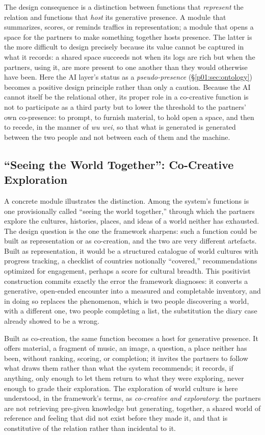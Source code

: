 The design consequence is a distinction between functions that \emph{represent} the relation and functions that \emph{host} its generative presence. A module that summarizes, scores, or reminds traffics in representation; a module that opens a space for the partners to make something together hosts presence. The latter is the more difficult to design precisely because its value cannot be captured in what it records: a shared space succeeds not when its logs are rich but when the partners, using it, are more present to one another than they would otherwise have been. Here the AI layer's status as a \emph{pseudo-presence} (§\ref{p01:sec:ontology}) becomes a positive design principle rather than only a caution. Because the AI cannot itself be the relational other, its proper role in a co-creative function is not to participate as a third party but to lower the threshold to the partners' own co-presence: to prompt, to furnish material, to hold open a space, and then to recede, in the manner of \emph{wu wei}, so that what is generated is generated between the two people and not between each of them and the machine.

\subsection{``Seeing the World Together'': Co-Creative Exploration}\label{p01:sec:seeingworld}

A concrete module illustrates the distinction. Among the system's functions is one provisionally called ``seeing the world together,'' through which the partners explore the cultures, histories, places, and ideas of a world neither has exhausted. The design question is the one the framework sharpens: such a function could be built as representation or as co-creation, and the two are very different artefacts. Built as representation, it would be a structured catalogue of world cultures with progress tracking, a checklist of countries notionally ``covered,'' recommendations optimized for engagement, perhaps a score for cultural breadth. This positivist construction commits exactly the error the framework diagnoses: it converts a generative, open-ended encounter into a measured and completable inventory, and in doing so replaces the phenomenon, which is two people discovering a world, with a different one, two people completing a list, the substitution the diary case already showed to be a wrong.

Built as co-creation, the same function becomes a host for generative presence. It offers material, a fragment of music, an image, a question, a place neither has been, without ranking, scoring, or completion; it invites the partners to follow what draws them rather than what the system recommends; it records, if anything, only enough to let them return to what they were exploring, never enough to grade their exploration. The exploration of world culture is here understood, in the framework's terms, as \emph{co-creative and exploratory}: the partners are not retrieving pre-given knowledge but generating, together, a shared world of reference and feeling that did not exist before they made it, and that is constitutive of the relation rather than incidental to it.

